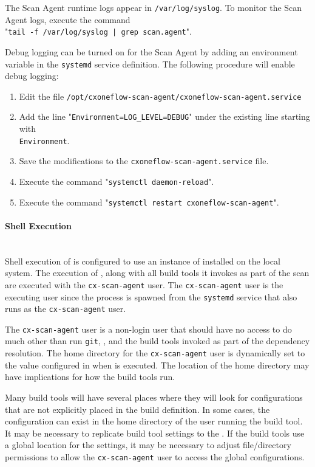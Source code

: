 The Scan Agent runtime logs appear in \texttt{/var/log/syslog}.  To monitor the Scan Agent logs, execute the command
\\"\texttt{tail -f /var/log/syslog | grep scan.agent}".

Debug logging can be turned on for the Scan Agent by adding an environment variable in the \texttt{systemd}
service definition.  The following procedure will enable debug logging:

\begin{enumerate}
  \item Edit the file \texttt{/opt/cxoneflow-scan-agent/cxoneflow-scan-agent.service}
  \item Add the line "\texttt{Environment=LOG\_LEVEL=DEBUG}" under the existing line starting with\\\texttt{Environment}.
  \item Save the modifications to the \texttt{cxoneflow-scan-agent.service} file.
  \item Execute the command "\texttt{systemctl daemon-reload}".
  \item Execute the command "\texttt{systemctl restart cxoneflow-scan-agent}".
\end{enumerate}

\paragraph{Shell Execution}\label{par:agent-shell-execution}

\noindent\\Shell execution of \scaresolver is configured to use an instance of \scaresolver installed on the local system.
The execution of \scaresolverns, along with all build tools it invokes as part of the scan are executed with the \texttt{cx-scan-agent}
user.  The \texttt{cx-scan-agent} user is the executing user since the process is spawned from the \texttt{systemd} service that also
runs as the \texttt{cx-scan-agent} user.

The \texttt{cx-scan-agent} user is a non-login user that should have no access to do much other than run \texttt{git}, \scaresolverns, and
the build tools invoked as part of the dependency resolution.  The home directory for the \texttt{cx-scan-agent} user is dynamically set
to the value configured in  when \scaresolver is executed.  The location
of the home directory may have implications for how the build tools run.

Many build tools will have several places where they will look for configurations that are not explicitly placed in the build
definition.  In some cases, the configuration can exist in the home directory of the user running the build tool.  It may be necessary
to replicate build tool settings to the .  If the build tools use a global location
for the settings, it may be necessary to adjust file/directory permissions to allow the \texttt{cx-scan-agent} user to access the global
configurations.

